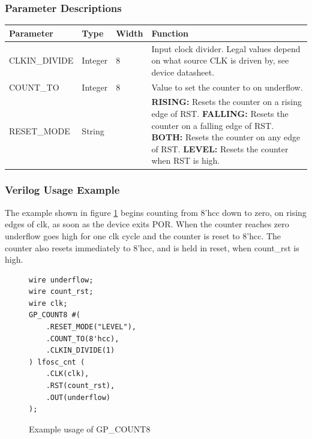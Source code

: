 \documentclass{article}
\begin{document}
\subsubsection{Parameter Descriptions}

\begin{tabularx}{5in}{|l|l|l|X|}
\hline
{\bfseries Parameter} & {\bfseries Type} & {\bfseries Width} & {\bfseries Function} \\
\hline
CLKIN\_DIVIDE & Integer & 8 &
	Input clock divider. Legal values depend on what source CLK is driven by, see device datasheet.\\
\hline
COUNT\_TO & Integer & 8 & Value to set the counter to on underflow. \\
\hline
RESET\_MODE & String &  & 
	{\bfseries RISING: } \newline Resets the counter on a rising edge of RST. \newline
	{\bfseries FALLING: } \newline Resets the counter on a falling edge of RST. \newline
	{\bfseries BOTH: } \newline Resets the counter on any edge of RST. \newline
	{\bfseries LEVEL: } \newline Resets the counter when RST is high. \\
\hline
\end{tabularx}

\pagebreak
\subsubsection{Verilog Usage Example}

The example shown in figure \ref{gp-count8-example} begins counting from 8'hcc down to zero, on rising edges of clk, as 
soon as the device exits POR. When the counter reaches zero underflow goes high for one clk cycle and the counter is 
reset to 8'hcc. The counter also resets immediately to 8'hcc, and is held in reset, when count\_rst is high.

\begin{figure}[h]
\begin{lstlisting}
wire underflow;
wire count_rst;
wire clk;
GP_COUNT8 #(
	.RESET_MODE("LEVEL"),
	.COUNT_TO(8'hcc),
	.CLKIN_DIVIDE(1)
) lfosc_cnt (
	.CLK(clk),
	.RST(count_rst),
	.OUT(underflow)
);
\end{lstlisting}
\caption{Example usage of GP\_COUNT8}
\label{gp-count8-example}
\end{figure}
\end{document}
